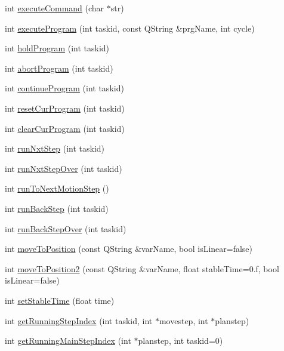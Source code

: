 \begin{DoxyCompactItemize}
int \hyperlink{classCUIApp_a82d14569d3fb78a02379cd061233754c}{execute\-Command} (char $\ast$str)
\item 
int \hyperlink{classCUIApp_a3725056976dca5ff4421b818e19aba41}{execute\-Program} (int taskid, const Q\-String \&prg\-Name, int cycle)
\item 
int \hyperlink{classCUIApp_a800f6928aa302c9898282b33d6f67063}{hold\-Program} (int taskid)
\item 
int \hyperlink{classCUIApp_acbf70cc0ff1d7a7d470424065984c37d}{abort\-Program} (int taskid)
\item 
int \hyperlink{classCUIApp_ac9e8075a0d1645830b451870368be7d7}{continue\-Program} (int taskid)
\item 
int \hyperlink{classCUIApp_aab24a02fe45512a2d04a03cf308f4846}{reset\-Cur\-Program} (int taskid)
\item 
int \hyperlink{classCUIApp_a1418345bd5ea072ad265e1832da5be1c}{clear\-Cur\-Program} (int taskid)
\item 
int \hyperlink{classCUIApp_a1cb0b7f420d5c736eabe5aeade669684}{run\-Nxt\-Step} (int taskid)
\item 
int \hyperlink{classCUIApp_a259d5dab2d54a11caf34c15cf8b7d7cc}{run\-Nxt\-Step\-Over} (int taskid)
\item 
int \hyperlink{classCUIApp_acf6132d19e753ba5548f9af6fbcaaa32}{run\-To\-Next\-Motion\-Step} ()
\item 
int \hyperlink{classCUIApp_a53d60c9f8804ed89187d1d06b0afb14c}{run\-Back\-Step} (int taskid)
\item 
int \hyperlink{classCUIApp_aa7570a64d24746ae8e876b78bafef329}{run\-Back\-Step\-Over} (int taskid)
\item 
int \hyperlink{classCUIApp_a44cdd21e80259e4718a443737e881cc1}{move\-To\-Position} (const Q\-String \&var\-Name, bool is\-Linear=false)
\item 
int \hyperlink{classCUIApp_ae6fb6a202f9d1a189c093eeb5e4ad4a9}{move\-To\-Position2} (const Q\-String \&var\-Name, float stable\-Time=0.f, bool is\-Linear=false)
\item 
int \hyperlink{classCUIApp_ab9ad5f3f98559557dcac912771043d34}{set\-Stable\-Time} (float time)
\item 
int \hyperlink{classCUIApp_ab37f3a8b7d7e183c81ba807b2e808cd8}{get\-Running\-Step\-Index} (int taskid, int $\ast$movestep, int $\ast$planstep)
\item 
int \hyperlink{classCUIApp_af00947fd23c355c47bfc4601ba4db337}{get\-Running\-Main\-Step\-Index} (int $\ast$planstep, int taskid=0)
\item 

\end{DoxyCompactItemize}
